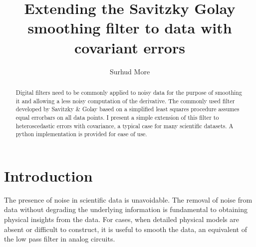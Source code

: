 \documentclass[iop, apj, onecolumn]{emulateapj}
\begin{document}


\title{Extending the Savitzky Golay smoothing filter to data with covariant
errors}
\author{
Surhud More 
}



\begin{abstract}
Digital filters need to be commonly applied to noisy data for the purpose of
smoothing it and allowing a less noisy computation of the derivative. The
commonly used filter developed by Savitzky \& Golay based on a simplified least
squares procedure assumes equal errorbars on all data points. I present a simple
extension of this filter to heteroscedastic errors with covariance, a typical
case for many scientific datasets. A python implementation is provided for ease
of use.
\end{abstract}

\keywords{}


\section{Introduction}
\label{sec:intro}

The presence of noise in scientific data is unavoidable. The removal of noise
from data without degrading the underlying information is fundamental to
obtaining physical insights from the data. For cases, when detailed physical
models are absent or difficult to construct, it is useful to smooth the data, an
equivalent of the low pass filter in analog circuits.
\end{document}
